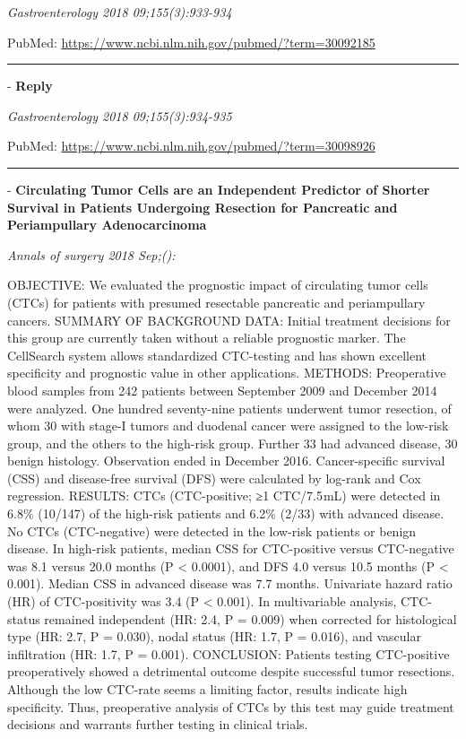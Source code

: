 \documentclass[]{article}
\begin{document}
\emph{Gastroenterology 2018 09;155(3):933-934}

PubMed: \url{https://www.ncbi.nlm.nih.gov/pubmed/?term=30092185}

{}

{}

\begin{center}\rule{0.5\linewidth}{\linethickness}\end{center}

 - \textbf{Reply}

\emph{Gastroenterology 2018 09;155(3):934-935}

PubMed: \url{https://www.ncbi.nlm.nih.gov/pubmed/?term=30098926}

{}

{}

\begin{center}\rule{0.5\linewidth}{\linethickness}\end{center}

 - \textbf{Circulating Tumor Cells are an Independent Predictor of
Shorter Survival in Patients Undergoing Resection for Pancreatic and
Periampullary Adenocarcinoma}

\emph{Annals of surgery 2018 Sep;():}

OBJECTIVE: We evaluated the prognostic impact of circulating tumor cells
(CTCs) for patients with presumed resectable pancreatic and
periampullary cancers. SUMMARY OF BACKGROUND DATA: Initial treatment
decisions for this group are currently taken without a reliable
prognostic marker. The CellSearch system allows standardized CTC-testing
and has shown excellent specificity and prognostic value in other
applications. METHODS: Preoperative blood samples from 242 patients
between September 2009 and December 2014 were analyzed. One hundred
seventy-nine patients underwent tumor resection, of whom 30 with stage-I
tumors and duodenal cancer were assigned to the low-risk group, and the
others to the high-risk group. Further 33 had advanced disease, 30
benign histology. Observation ended in December 2016. Cancer-specific
survival (CSS) and disease-free survival (DFS) were calculated by
log-rank and Cox regression. RESULTS: CTCs (CTC-positive; ≥1 CTC/7.5 mL)
were detected in 6.8\% (10/147) of the high-risk patients and 6.2\%
(2/33) with advanced disease. No CTCs (CTC-negative) were detected in
the low-risk patients or benign disease. In high-risk patients, median
CSS for CTC-positive versus CTC-negative was 8.1 versus 20.0 months (P
\textless{} 0.0001), and DFS 4.0 versus 10.5 months (P \textless{}
0.001). Median CSS in advanced disease was 7.7 months. Univariate hazard
ratio (HR) of CTC-positivity was 3.4 (P \textless{} 0.001). In
multivariable analysis, CTC-status remained independent (HR: 2.4, P =
0.009) when corrected for histological type (HR: 2.7, P = 0.030), nodal
status (HR: 1.7, P = 0.016), and vascular infiltration (HR: 1.7, P =
0.001). CONCLUSION: Patients testing CTC-positive preoperatively showed
a detrimental outcome despite successful tumor resections. Although the
low CTC-rate seems a limiting factor, results indicate high specificity.
Thus, preoperative analysis of CTCs by this test may guide treatment
decisions and warrants further testing in clinical trials.
\end{document}
